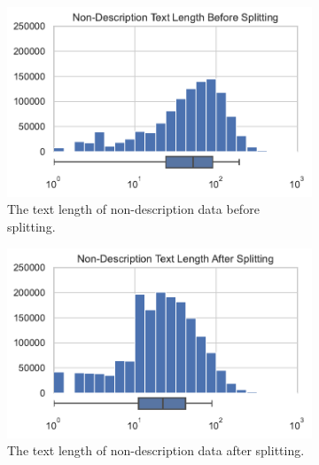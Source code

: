 \documentclass[a4paper, 12pt, oneside]{book} %
\begin{document}
\begin{figure} [htpb]
     \centering
     \begin{subfigure}[b]{0.49\textwidth}
         \centering
         \includegraphics[width=\textwidth]{figures/histogram_text_length_1.pdf}
         \caption{The text length of non-description data before splitting.}
         \label{fig:text_length_1}
     \end{subfigure}
     \hfill
     \begin{subfigure}[b]{0.49\textwidth}
         \centering
         \includegraphics[width=\textwidth]{histogram_text_length_3.pdf}
         \caption{The text length of non-description data after splitting.}
         \label{fig:text_length_3}
     \end{subfigure}
     \vfill
     \begin{subfigure}[b]{0.49\textwidth}
         \centering

\end{subfigure}
\end{figure}
\end{document}
